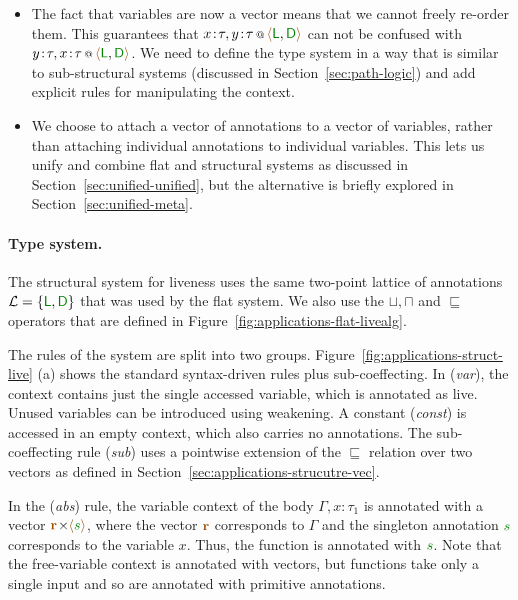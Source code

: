\begin{itemize}
\item The fact that variables are now a vector means that we cannot freely re-order them. This
  guarantees that $\coctx{x\!:\!\tau, y\!:\!\tau}{\alift{\cclrd{\ident{L}}, \cclrd{\ident{D}}}}$
  can not be confused with $\coctx{y\!:\!\tau, x\!:\!\tau}{\alift{\cclrd{\ident{L}}, \cclrd{\ident{D}}}}$.
  We need to define the type system in a way that is similar to sub-structural systems 
  (discussed in Section~\ref{sec:path-logic}) and add explicit rules for manipulating
  the context. 

\item We choose to attach a vector of annotations to a vector of variables, rather than attaching
  individual annotations to individual variables. This lets us unify and combine flat and 
  structural systems as discussed in Section~\ref{sec:unified-unified}, but the alternative is briefly
  explored in Section~\ref{sec:unified-meta}.
\end{itemize}

\paragraph{Type system.}
The structural system for liveness uses the same two-point lattice of annotations
$\mathcal{L}=\{ \cclrd{\ident{L}}, \cclrd{\ident{D}} \}$ that was used by the flat system. We also use the
$\sqcup, \sqcap$ and $\sqsubseteq$ operators that are defined in Figure~\ref{fig:applications-flat-livealg}.

The rules of the system are split into two groups. Figure~\ref{fig:applications-struct-live} (a) shows 
the standard syntax-driven rules plus sub-coeffecting. In (\emph{var}), the context contains just the 
single accessed variable, which is annotated as live. Unused variables can be introduced using weakening. 
A constant (\emph{const}) is accessed in an empty context, which also carries no annotations. The
sub-coeffecting rule (\emph{sub}) uses a pointwise extension of the $\sqsubseteq$ relation over two
vectors as defined in Section~\ref{sec:applications-strucutre-vec}.

In the (\emph{abs}) rule, the variable context of the body $\Gamma, x\!:\!\tau_1$ is annotated with
a vector $\mathbf{\aclrd{r}}\cons\alift{\cclrd{s}}$, where the vector $\mathbf{\aclrd{r}}$ corresponds
to $\Gamma$ and the singleton annotation $\cclrd{s}$ corresponds to the variable $x$. Thus, the
function is annotated with $\cclrd{s}$. Note that the free-variable context is annotated with vectors,
but functions take only a single input and so are annotated with primitive annotations.

